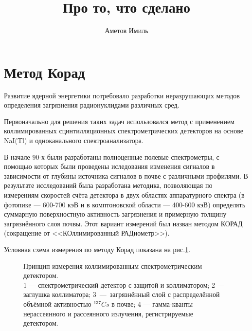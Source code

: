 \documentclass[12pt]{article}
\author{Аметов Имиль}
\title{Про то, что сделано}
\begin{document}
\maketitle
\newpage
\tableofcontents
\newpage
\section{Метод Корад}

Развитие ядерной энергетики потребовало разработки неразрушающих методов определения загрязнения радионуклидами различных сред.

Первоначально для решения таких задач использовался метод с применением коллимированных сцинтилляционных спектрометрических детекторов на основе NaI(Tl) и одноканального спектроанализатора.

В начале 90-х были разработаны полноценные полевые спектрометры, с помощью которых были проведены иследования изменения сигналов в зависимости от глубины источника сигналов в почве с различными профилями. В результате исследований была разработана методика, позволяющая по измерениям скоростей счёта детектора в двух областях аппаратурного спектра (в фотопике --- 600-700 кэВ и в комптоновской области --- 400-600 кэВ) определять суммарную поверхностную активность загрязнения и примерную толщину загрязнённого слоя почвы. Этот вариант измерений был назван методом КОРАД (сокращение от <<КОллимированный РАДиометр>>).

Условная схема измерения по методу Корад показана на рис.\ref{fig:detector}.

\begin{figure}[h]
\caption{Принцип измерения коллимированным спектрометрическим детектором. \\ 1 --- спектрометрический детектор с защитой и коллиматором; 2 --- заглушка коллиматора; 3~---~загрязнённый слой с распределённой объёмной активностью ${}^{137}Cs$ в почве; 4 --- гамма-кванты нерассеянного и рассеянного излучения, регистрируемые детектором.}
\label{fig:detector}
\end{figure}
\end{document}
